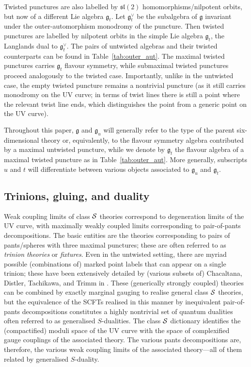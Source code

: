 \documentclass[a4paper]{article}
\def\SS{{\cal S}}
\def\slf{\mathfrak{sl}}
\def\gf{\mathfrak{g}}
\begin{document}
Twisted punctures are also labelled by $\slf(2)$ homomorphisms/nilpotent orbits, but now of a different Lie algebra $\gf_t$. Let $\gf_t^\vee$ be the subalgebra of $\gf$ invariant under the outer-automorphism monodromy of the puncture. Then twisted punctures are labelled by nilpotent orbits in the simple Lie algebra $\gf_t$, the Langlands dual to $\gf_t^\vee$. The pairs of untwisted algebras and their twisted counterparts can be found in Table~\ref{tab:outer_aut}. The maximal twisted punctures carries $\gf_t$ flavour symmetry, while submaximal twisted punctures proceed analogously to the twisted case. Importantly, unlike in the untwisted case, the empty twisted puncture remains a nontrivial puncture (as it still carries monodromy on the UV curve; in terms of twist lines there is still a point where the relevant twist line ends, which distinguishes the point from a generic point on the UV curve).

Throughout this paper, $\gf$ and $\gf_u$ will generally refer to the type of the parent six-dimensional theory or, equivalently, to the flavour symmetry algebra contributed by a maximal untwisted puncture, while we denote by $\gf_t$ the flavour algebra of a maximal twisted puncture as in Table~\ref{tab:outer_aut}. More generally, subscripts $u$ and $t$ will differentiate between various objects associated to $\gf_u$ and $\gf_t$.

\subsection{\label{subsec:trinions_and_duality}Trinions, gluing, and duality}

Weak coupling limits of class $\SS$ theories correspond to degeneration limits of the UV curve, with maximally weakly coupled limits corresponding to pair-of-pants decompositions. The basic entities are the theories corresponding to pairs of pants/spheres with three maximal punctures; these are often referred to as \emph{trinion theories} or \emph{fixtures}. Even in the untwisted setting, there are myriad possible (combinations of) marked point labels that can appear on a single trinion; these have been extensively detailed by (various subsets of) Chacaltana, Distler, Tachikawa, and Trimm in \cite{Chacaltana:2012zy,Chacaltana:2010ks,Chacaltana:2011ze}. These (generically strongly coupled) theories can be combined by exactly marginal gauging to realise general class $\SS$ theories, but the equivalence of the SCFTs realised in this manner by inequivalent pair-of-pants decompositions constitutes a highly nontrivial set of quantum dualities often referred to as generalised $S$-dualities. The class $\SS$ dictionary identifies the (compactified) moduli space of the UV curve with the space of complexified gauge couplings of the associated theory. The various pants decompositions are, therefore, the various weak coupling limits of the associated theory---all of them related by generalised $S$-duality.
\end{document}
